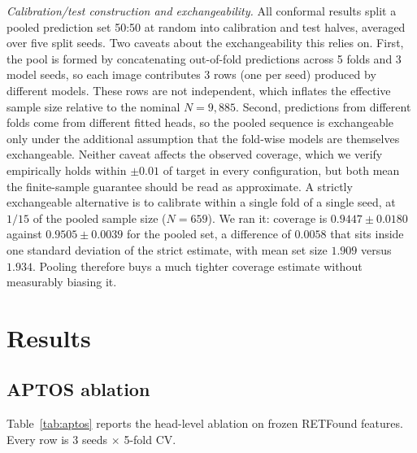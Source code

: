 \documentclass[journal]{IEEEtran}
\begin{document}
\emph{Calibration/test construction and exchangeability.} All conformal results split a pooled prediction set 50:50 at random into calibration and test halves, averaged over five split seeds. Two caveats about the exchangeability this relies on. First, the pool is formed by concatenating out-of-fold predictions across 5 folds and 3 model seeds, so each image contributes 3 rows (one per seed) produced by different models. These rows are not independent, which inflates the effective sample size relative to the nominal $N = 9{,}885$. Second, predictions from different folds come from different fitted heads, so the pooled sequence is exchangeable only under the additional assumption that the fold-wise models are themselves exchangeable. Neither caveat affects the observed coverage, which we verify empirically holds within $\pm 0.01$ of target in every configuration, but both mean the finite-sample guarantee should be read as approximate. A strictly exchangeable alternative is to calibrate within a single fold of a single seed, at $1/15$ of the pooled sample size ($N = 659$). We ran it: coverage is $0.9447 \pm 0.0180$ against $0.9505 \pm 0.0039$ for the pooled set, a difference of $0.0058$ that sits inside one standard deviation of the strict estimate, with mean set size $1.909$ versus $1.934$. Pooling therefore buys a much tighter coverage estimate without measurably biasing it.

\section{Results}
\label{sec:results}

\subsection{APTOS ablation}
\label{sec:aptos}

Table~\ref{tab:aptos} reports the head-level ablation on frozen RETFound features. Every row is 3 seeds $\times$ 5-fold CV.
\end{document}

